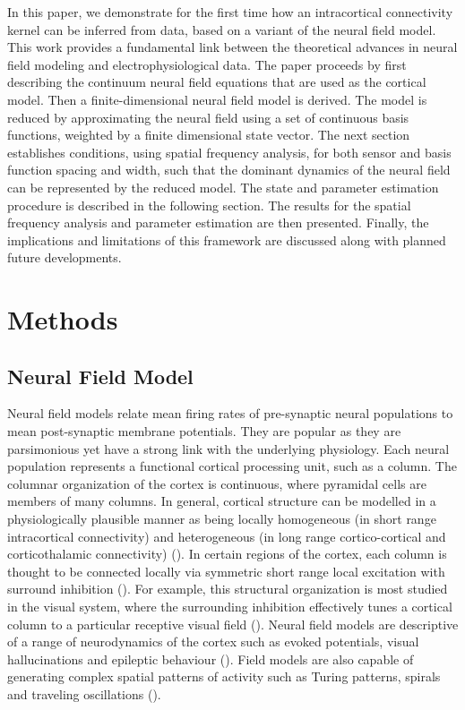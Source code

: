 \documentclass[5p,authoryear]{elsarticle}
\begin{document}
In this paper, we demonstrate for the first time how an intracortical connectivity kernel can be inferred from data, based on a variant of the \cite{Wilson1973} neural field model. This work provides a fundamental link between the theoretical advances in neural field modeling and electrophysiological data. The paper proceeds by first describing the continuum neural field equations that are used as the cortical model. Then a finite-dimensional neural field model is derived. The model is reduced by approximating the neural field using a set of continuous basis functions, weighted by a finite dimensional state vector. The next section establishes conditions, using spatial frequency analysis, for both sensor and basis function spacing and width, such that the dominant dynamics of the neural field can be represented by the reduced model. The state and parameter estimation procedure is described in the following section. The results for the spatial frequency analysis and parameter estimation are then presented. Finally, the implications and limitations of this framework are discussed along with planned future developments.

\section{Methods}

\subsection{Neural Field Model}\label{NeuralModelSection} 
Neural field models relate mean firing rates of pre-synaptic neural populations to mean post-synaptic membrane potentials. They are popular as they are parsimonious yet have a strong link with the underlying physiology. Each neural population represents a functional cortical processing unit, such as a column. The columnar organization of the cortex is continuous, where pyramidal cells are members of many columns. In general, cortical structure can be modelled in a physiologically plausible manner as being locally homogeneous (in short range intracortical connectivity) and heterogeneous (in long range cortico-cortical and corticothalamic connectivity) (\cite{Jirsa2009,Qubbaj2007}). In certain regions of the cortex, each column is thought to be connected locally via symmetric short range local excitation with surround inhibition (\cite{Braitenberg1998}). For example, this structural organization is most studied in the visual system, where the surrounding inhibition effectively tunes a cortical column to a particular receptive visual field (\cite{Sullivan2006}). Neural field models are descriptive of a range of neurodynamics of the cortex such as evoked potentials, visual hallucinations and epileptic behaviour (\cite{David2003,Bressloff2001,Breakspear2006}). Field models are also capable of generating complex spatial patterns of activity such as Turing patterns, spirals and traveling oscillations (\cite{Amari1977,Coombes2005,Coombes2007}).
\end{document}
